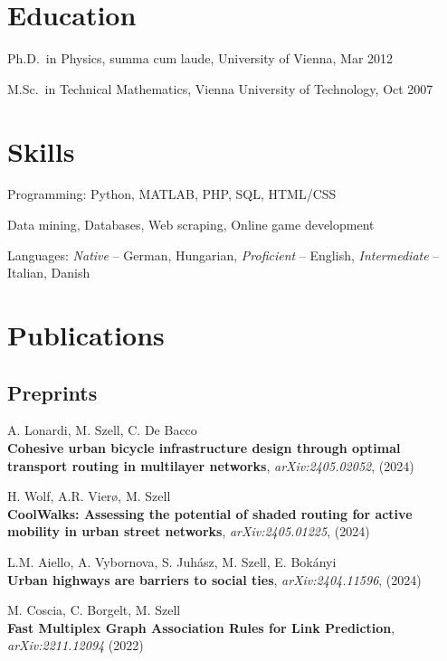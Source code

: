 \documentclass[10pt,a4paper]{article}
\renewenvironment{itemize}{
  \begin{list}{}{
    \setlength{\leftmargin}{1.5em}
    \setlength{\itemsep}{0.25em}
    \setlength{\parskip}{0pt}
    \setlength{\parsep}{0.25em}
  }
}{
  \end{list}
}
\begin{document}

\section*{Education}

\begin{itemize}
  \item Ph.D.~in Physics, summa cum laude, University of Vienna, Mar 2012
  \item M.Sc.~in Technical Mathematics, Vienna University of Technology, Oct 2007
\end{itemize}

\section*{Skills}
\begin{itemize}
\item{Programming: Python, MATLAB, PHP, SQL, HTML/CSS}
\item{Data mining, Databases, Web scraping, Online game development}
\item{Languages: \emph{Native} -- German, Hungarian, \emph{Proficient} -- English, \emph{Intermediate} -- Italian, Danish}
\end{itemize}


\section*{Publications}

\subsection*{Preprints}
\begin{itemize}
\setlength\itemsep{1em}
\item A. Lonardi, M. Szell, C. De Bacco\\
    \textbf{Cohesive urban bicycle infrastructure design through optimal transport routing in multilayer networks}, \textit{arXiv:2405.02052}, (2024)
\item H. Wolf, A.R. Vierø, M. Szell\\
    \textbf{CoolWalks: Assessing the potential of shaded routing for active mobility in urban street networks}, \textit{arXiv:2405.01225}, (2024)

\item L.M. Aiello, A. Vybornova, S. Juhász, M. Szell, E. Bokányi\\
    \textbf{Urban highways are barriers to social ties}, \textit{arXiv:2404.11596}, (2024)
\item M. Coscia, C. Borgelt, M. Szell\\
    \textbf{Fast Multiplex Graph Association Rules for Link Prediction}, \textit{arXiv:2211.12094} (2022)
\end{itemize}
\end{document}
